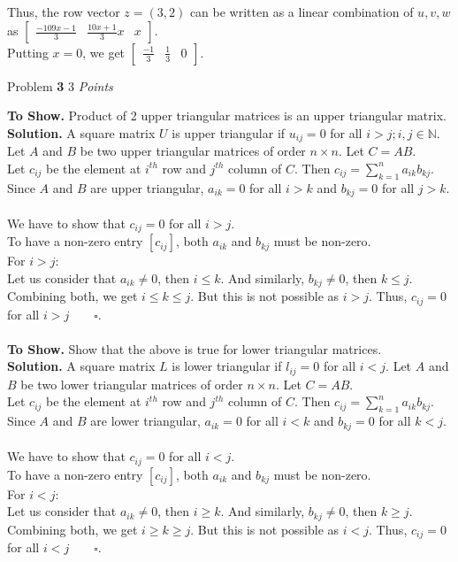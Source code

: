 \documentclass[11pt]{article}
\newcommand{\problem
}[2]{
\begin{mdframed}
    Problem \textbf{#1} \hfill #2
\end{mdframed}
}
\begin{document}
\noindent Thus, the row vector $z = (3, 2)$ can be written as a linear combination of $u, v, w$ as $\begin{bmatrix} \frac{-109x -  1}{3} & \frac{10x + 1}{3}x & x \end{bmatrix}$.
\\
Putting $x = 0$, we get $\begin{bmatrix} \frac{-1}{3} & \frac{1}{3} & 0 \end{bmatrix}$.



\problem{3}{3 \emph{Points}}
\textbf{To Show. } Product of 2 upper triangular matrices is an upper triangular matrix.\\
\textbf{Solution. } A square matrix $U$ is upper triangular if $u_{ij} = 0$ for all $i > j; i, j \in \mathbb{N}$. Let $A$ and $B$ be two upper triangular matrices of order $n \times n$. Let $C = AB$.\\
Let $c_{ij}$ be the element at $i^{th}$ row and $j^{th}$ column of $C$. Then $c_{ij} = \sum_{k=1}^{n} a_{ik}b_{kj}$. Since $A$ and $B$ are upper triangular, $a_{ik} = 0$ for all $i > k$ and $b_{kj} = 0$ for all $j > k$.\\
\\
We have to show that $c_{ij} = 0$ for all $i > j$.\\
To have a non-zero entry $[c_{ij}]$, both $a_{ik}$ and $b_{kj}$ must be non-zero.
\\
For $i > j$: \\ Let us consider that $a_{ik} \neq 0$, then $i \leq k$. And similarly, $b_{kj} \neq 0$, then $k \leq j$. Combining both, we get $i \leq k \leq j$. But this is not possible as $i > j$. Thus, $c_{ij} = 0$ for all $i > j \qquad \square$.\\
\\
\textbf{To Show. } Show that the above is true for lower triangular matrices.\\
\textbf{Solution. } A square matrix $L$ is lower triangular if $l_{ij} = 0$ for all $i < j$. Let $A$ and $B$ be two lower triangular matrices of order $n \times n$. Let $C = AB$.\\
Let $c_{ij}$ be the element at $i^{th}$ row and $j^{th}$ column of $C$. Then $c_{ij} = \sum_{k=1}^{n} a_{ik}b_{kj}$. Since $A$ and $B$ are lower triangular, $a_{ik} = 0$ for all $i < k$ and $b_{kj} = 0$ for all $k < j$.\\
\\
We have to show that $c_{ij} = 0$ for all $i < j$.\\
To have a non-zero entry $[c_{ij}]$, both $a_{ik}$ and $b_{kj}$ must be non-zero.
\\
For $i < j$: \\ Let us consider that $a_{ik} \neq 0$, then $i \geq k$. And similarly, $b_{kj} \neq 0$, then $k \geq j$. Combining both, we get $i \geq k \geq j$. But this is not possible as $i < j$. Thus, $c_{ij} = 0$ for all $i < j \qquad \square$.
\end{document}
